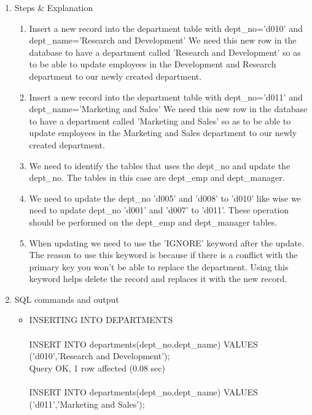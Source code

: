 \documentclass[]{article}
\begin{document}
\begin{enumerate}
\item Steps \& Explanation
\renewcommand{\labelenumii}{\Roman{enumii}}
\begin{enumerate}
\item Insert a new record into the department table with dept\_no='d010' and dept\_name='Research and 							Development'
We need this new row in the database to have a department called 'Research and Development' so as to be able to
update employees in the Development and Research department to our newly created department.
\\
\item Insert a new record into the department table with dept\_no='d011' and dept\_name='Marketing and Sales'
We need this new row in the database to have a department called 'Marketing and Sales' so as to be able to
update employees in the Marketing and Sales department to our newly created department.
\\
\item We need to identify the tables that uses the dept\_no and update the dept\_no. The tables in this case are 				dept\_emp and dept\_manager. 
\\
\item We need to update the dept\_no 'd005' and 'd008' to 'd010' like wise we need to update dept\_no 				 			'd001' and 'd007' to 'd011'. These operation should be performed on the dept\_emp and dept\_manager tables.
\\
\item When updating we need to use the 'IGNORE' keyword after the update. The reason to use this keyword is because if 			there is a conflict with the primary key you won't be able to replace the department. Using this keyword helps 					delete the record and replaces it with the new record.
\end{enumerate}
\item SQL commands and output
\begin{itemize}
\item INSERTING INTO DEPARTMENTS
\\\\
INSERT INTO departments(dept\_no,dept\_name) VALUES ('d010','Research and Development');
\\
Query OK, 1 row affected (0.08 sec)
\\\\
INSERT INTO departments(dept\_no,dept\_name) VALUES ('d011','Marketing and Sales');
\\

\end{itemize}
\end{enumerate}
\end{document}
